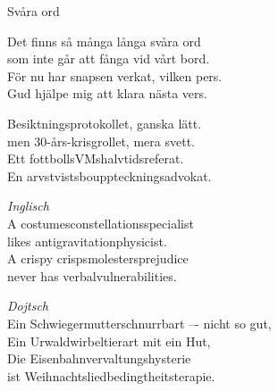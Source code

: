 \begin{song}{Svåra ord}

	
	
	Det finns så många långa svåra ord\\
	som inte går att fånga vid vårt bord.\\
	För nu har snapsen verkat, vilken pers.\\
	Gud hjälpe mig att klara nästa vers.

	Besiktningsprotokollet, ganska lätt.\\
	men 30-års-krisgrollet, mera svett.\\
	Ett fottbollsVMshalvtidsreferat.\\
	En arvstvistsbouppteckningsadvokat.

	\emph{Inglisch}\\
	A costumesconstellationsspecialist\\
	likes antigravitationphysicist.\\
	A crispy crispsmolestersprejudice\\
	never has verbalvulnerabilities.

	\emph{Dojtsch}\\
	Ein Schwiegermutterschnurrbart –- nicht so gut,\\
	Ein Urwaldwirbeltierart mit ein Hut,\\
	Die Eisenbahnvervaltungshysterie\\
	ist Weihnachtsliedbedingtheitsterapie.
	
\end{song}
